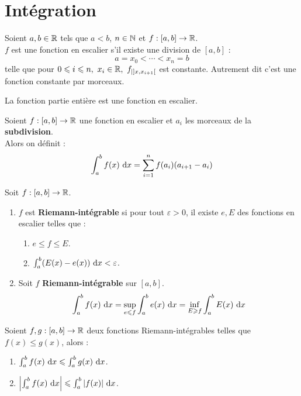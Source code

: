 \chapter{Intégration}
\def\arraystretch{1}

\begin{definition}
	Soient $a, b \in \mathbb{R}$ tels que $a < b$, $n \in \mathbb{N}$ et $f : [a, b] \to \mathbb{R}$.
	\\
	$f$ est une fonction en escalier s'il existe une division de $[a, b]$ :
	\[ a = x_0 < \cdots < x_n = b \]
	telle que pour $0 \leqslant i \leqslant n,\ x_i \in \mathbb{R},\  f_{| ]x, x_{i+1}[}$ est constante.
	Autrement dit c'est une fonction constante par morceaux.
\end{definition}

\begin{example}
	La fonction partie entière est une fonction en escalier.
\end{example}

\begin{definition}
	Soient $f : [a, b] \to \mathbb{R}$ une fonction en escalier et $a_i$ les morceaux de la \textbf{subdivision}.
	\\
	Alors on définit :
	\[ \int_{a}^{b} f(x) \ \diffd x = \sum_{i = 1}^{n} f(a_i) (a_{i+1} - a_i) \]
\end{definition}

\begin{definition}
	Soit $f : [a, b] \to \mathbb{R}$. 
	\begin{enumerate}
		\item $f$ est \textbf{Riemann-intégrable} si pour tout $\varepsilon > 0$, il existe $e, E$ des fonctions en escalier telles que :
		\begin{enumerate}
			\item $e \leq f \leq E$.
			\item $\int_{a}^{b} (E(x) - e(x)) \ \diffd x < \varepsilon$.
		\end{enumerate}
		\item Soit $f$ \textbf{Riemann-intégrable} sur $[a, b]$.
		\[ \int_{a}^{b} f(x) \ \diffd x = \underset{e \leq f}{\sup} \int_{a}^{b} e(x) \ \diffd x = \underset{E \geq f}{\inf} \int_{a}^{b} E(x) \ \diffd x \]
	\end{enumerate}
\end{definition}

\begin{lemma}
	Soient $f, g : [a, b] \to \mathbb{R}$ deux fonctions Riemann-intégrables telles que $f(x) \leq g(x)$, alors :
	\begin{enumerate}
		\item $\int_{a}^{b} f(x) \ \diffd x \leq \int_{a}^{b} g(x) \ \diffd x$.
		\item $\abs{\int_{a}^{b} f(x) \ \diffd x} \leq \int_{a}^{b} \abs{f(x)} \ \diffd x$.
	\end{enumerate}
\end{lemma}

